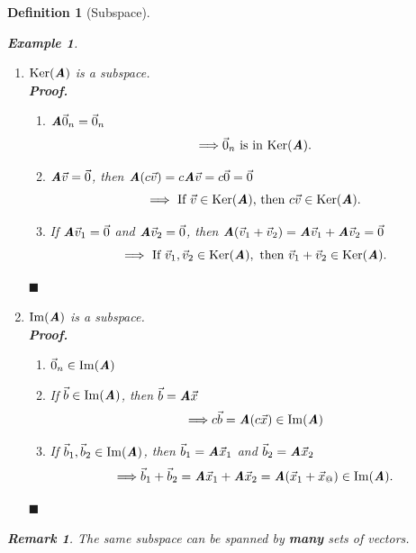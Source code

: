 \documentclass[12pt, a4paper]{article}
\newtheorem{df}{Definition}[subsection]
\newtheorem{eg}{Example}[subsection]
\newtheorem*{rmk}{\indent Remark}
\newenvironment*{prf}{\indent\textbf{\textit{Proof. }}}{\hfill $\blacksquare$\par}
\def\IM{{\mathrm{Im}}}
\def\Ker{\mathrm{Ker}}
\def\vecx{\vec{x}}
\def\vecv{\vec{v}}
\def\vecb{\vec{b}}
\def\matrixA{\textbf{\emph{A}}}
\begin{document}
\begin{df}[Subspace]
\begin{eg}
\begin{enumerate}
		\item $\Ker(\matrixA)$ is a subspace.\\
		\begin{prf}
			\begin{enumerate}
				\item $\matrixA\vec{0}_n=\vec{0}_n$\[\Longrightarrow\vec{0}_n\text{ is in }\Ker(\matrixA).\]
				\item $\matrixA\vecv=\vec{0}$, then $\matrixA(c\vecv)=c\matrixA\vecv=c\vec{0}=\vec{0}$\[\Longrightarrow\text{ If }\vecv\in\Ker(\matrixA)\text{, then }c\vecv\in\Ker(\matrixA).\]
				\item If $\matrixA\vecv_1=\vec{0}$ and $\matrixA\vecv_2=\vec{0}$, then $\matrixA(\vecv_1+\vecv_2)=\matrixA\vecv_1+\matrixA\vecv_2=\vec{0}$\[\Longrightarrow\text{ If }\vecv_1,\vecv_2\in\Ker(\matrixA),\text{ then }\vecv_1+\vecv_2\in\Ker(\matrixA).\]
			\end{enumerate}	
		\end{prf}
		\item $\IM(\matrixA)$ is a subspace.\\
		\begin{prf}
			\begin{enumerate}
				\item $\vec{0}_n\in\IM(\matrixA)$
				\item If $\vecb\in\IM(\matrixA)$, then $\vecb=\matrixA\vecx$\[\Longrightarrow c\vecb=\matrixA(c\vecx)\in\IM(\matrixA)\]
				\item If $\vecb_1,\vecb_2\in\IM(\matrixA)$, then $\vecb_1=\matrixA\vecx_1$ and $\vecb_2=\matrixA\vecx_2$\[\Longrightarrow\vecb_1+\vecb_2=\matrixA\vecx_1+\matrixA\vecx_2=\matrixA(\vecx_1+\vecx_@)\in\IM(\matrixA).\]
			\end{enumerate}	
		\end{prf}
	\end{enumerate}
	\end{eg}
	\begin{rmk}
		The same subspace can be spanned by \textbf{many} sets of vectors.	
	\end{rmk}
\end{df}
\end{document}
